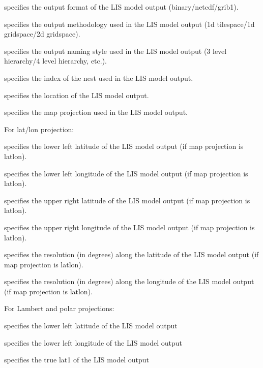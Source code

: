  specifies the output format of the LIS model output
 (binary/netcdf/grib1).

 specifies the output methodology used in the LIS model output
 (1d tilespace/1d gridspace/2d gridspace).

 specifies the output naming style used in the LIS model output 
 (3 level hierarchy/4 level hierarchy, etc.).

 specifies the index of the nest used in the LIS model output.

 specifies the location of the LIS model output.

 specifies the map projection used in the LIS model output.

 For lat/lon projection:

 specifies the lower left latitude of the LIS model output
 (if map projection is latlon).

 specifies the lower left longitude of the LIS model output
 (if map projection is latlon).

 specifies the upper right latitude of the LIS model output
 (if map projection is latlon).

 specifies the upper right longitude of the LIS model output
 (if map projection is latlon).

 specifies the resolution (in degrees) along the latitude of the
 LIS model output (if map projection is latlon).

 specifies the resolution (in degrees) along the longitude of the
 LIS model output (if map projection is latlon).

 For Lambert and polar projections:

 specifies the lower left latitude of the LIS model output

 specifies the lower left longitude of the LIS model output

 specifies the true lat1 of the LIS model output

